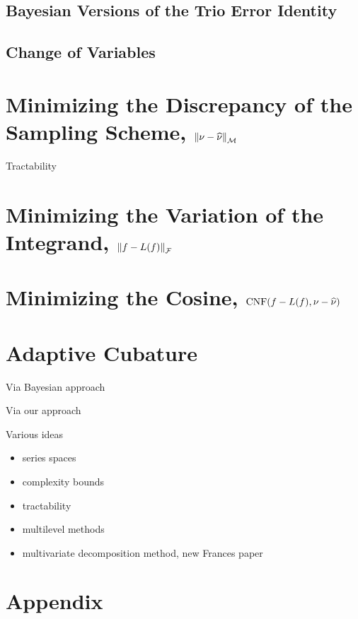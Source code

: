 \documentclass[graybox,footinfo]{svmult}
\DeclareMathOperator{\algn}{CNF}
\begin{document}
\subsection{Bayesian Versions of the Trio Error Identity}

\subsection{Change of Variables}


\section{Minimizing the Discrepancy of the Sampling Scheme, $\left \lVert \nu - \widehat{\nu} \right \rVert_{\mathcal{M}}$}

Tractability

\section{Minimizing the Variation of the Integrand, $\left \lVert f - L(f) \right \rVert_{\mathcal{F}}$}

\section{Minimizing the Cosine, $\algn(f - L(f),\nu - \hnu)$}

\section{Adaptive Cubature}
Via Bayesian approach

Via our approach

Various ideas
\begin{itemize}
\item series spaces
\item complexity bounds
\item tractability
\item multilevel methods
\item multivariate decomposition method, new Frances paper
\end{itemize}




\appendix
\section{Appendix}
\end{document}
